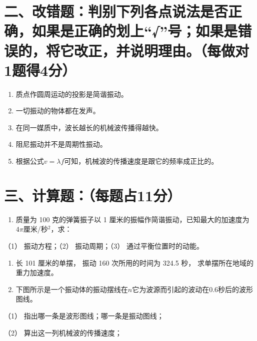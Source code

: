 \section{二、改错题：判别下列各点说法是否正确，如果是正确的划上``√''号；如果是错误的，将它改正，并说明理由。（每做对1题得4分）}\label{ux4e8cux6539ux9519ux9898ux5224ux522bux4e0bux5217ux5404ux70b9ux8bf4ux6cd5ux662fux5426ux6b63ux786eux5982ux679cux662fux6b63ux786eux7684ux5212ux4e0aux53f7ux5982ux679cux662fux9519ux8befux7684ux5c06ux5b83ux6539ux6b63ux5e76ux8bf4ux660eux7406ux7531ux6bcfux505aux5bf91ux9898ux5f974ux5206}

\begin{enumerate}
\def\labelenumi{\arabic{enumi}.}
\item
  质点作圆周运动的投影是简谐振动。
\item
  一切振动的物体都在发声。
\item
  在同一媒质中，波长越长的机械波传播得越快。
\item
  阻尼振动并不是周期性振动。
\item
  根据公式\(v=\lambda f\)可知，机械波的传播速度是跟它的频率成正比的。
\end{enumerate}

\section{三、计算题：（每题占11分）}\label{ux4e09ux8ba1ux7b97ux9898ux6bcfux9898ux536011ux5206}

\begin{enumerate}
\def\labelenumi{\arabic{enumi}.}
\tightlist
\item
  质量为 100 克的弹簧振子以 1
  厘米的振幅作简谐振动，已知最大的加速度为\(4 \pi\)厘米/秒\(^{2}\)，求：
\end{enumerate}

（1） 振动方程；（2） 振动周期；（3） 通过平衡位置时的动能。

\begin{enumerate}
\def\labelenumi{\arabic{enumi}.}
\setcounter{enumi}{1}
\item
  长 101 厘米的单摆， 振动 160 次所用的时间为 324.5 秒，
  求单摆所在地域的重力加速度。
\item
  下图所示是一个振动体的振动摆线在\(n\)它为波源而引起的波动在0.6秒后的波形图线。
\end{enumerate}

（1） 指出哪一条是波形图线；哪一条是振动图线；

（2） 算出这一列机械波的传播速度；

